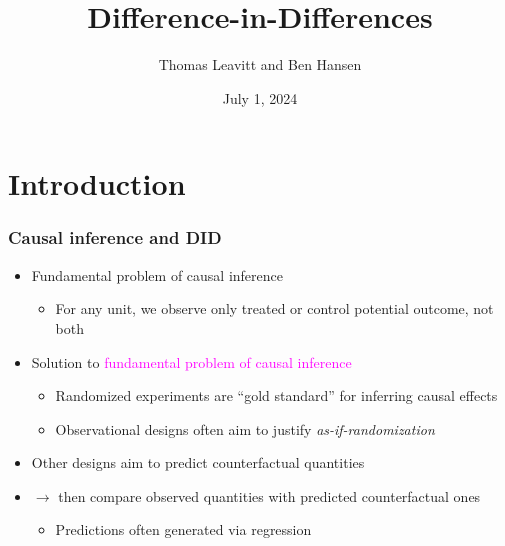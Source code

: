 \documentclass[table, xcolor = {dvipsnames}, 9pt]{beamer}
\title[]{Difference-in-Differences} %
\author{Thomas Leavitt and Ben Hansen} %
\institute[] %
{
\medskip
}
\date{July 1, 2024} %
\theoremstyle{plain}
\begin{document}
\begin{frame}
\titlepage %
\end{frame}


\section{Introduction}
\begin{frame}[t]
\frametitle{Causal inference and DID}
\vfill
\begin{itemize} \vfill
\item Fundamental problem of causal inference \citep{holland1986} \vfill
\begin{itemize} \vfill
\item For any unit, we observe only treated or control potential outcome, not both
\end{itemize} \vfill
\item Solution to \textcolor{magenta}{fundamental problem of causal inference} \vfill
\begin{itemize} \vfill
\item Randomized experiments are ``gold standard'' for inferring causal effects \vfill
\item Observational designs often aim to justify \textit{as-if-randomization} \vfill
\end{itemize}
\item Other designs aim to predict counterfactual quantities \vfill
\item[] $\rightarrow$ then compare observed quantities with predicted counterfactual ones \vfill 
\begin{itemize} \vfill
\item Predictions often generated via regression \vfill
\end{itemize} \vfill
\end{itemize} \vfill
\vfill
\end{frame}
\end{document}
